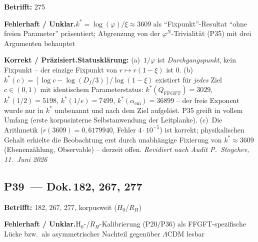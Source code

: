 \noindent\textbf{Betrifft:} 275


\smallskip\noindent\textbf{Fehlerhaft / Unklar.}\quad $k^* = \log(\varphi)/\xi \approx 3609$ als \enquote{Fixpunkt}-Resultat
  \enquote{ohne freien Parameter} präsentiert; Abgrenzung von der
  $\varphi^N$-Trivialität (P35) mit drei Argumenten behauptet


\smallskip\noindent\textbf{Korrekt / Präzisiert.}\quad \textbf{Statusklärung:} (a)~$1/\varphi$ ist \emph{Durchgangspunkt},
  kein Fixpunkt -- der einzige Fixpunkt von $r\mapsto r(1-\xi)$ ist $0$.
  (b)~$k^*(c) = [\log c - \log(D_f/3)]/\log(1-\xi)$ existiert für
  \emph{jedes} Ziel $c\in(0,1)$ mit identischem Parameterstatus:
  $k^*(Q_\mathrm{FFGFT})=3029$, $k^*(1/2)=5198$, $k^*(1/e)=7499$,
  $k^*(\alpha_\mathrm{em})=36899$ -- der freie Exponent wurde nur in
  $k^*$ umbenannt und nach dem Ziel aufgelöst. P35 greift in vollem
  Umfang (erste korpusinterne Selbstanwendung der Leitplanke).
  (c)~Die Arithmetik ($r(3609)=0{,}6179940$, Fehler $4{\cdot}10^{-5}$)
  ist korrekt; physikalischen Gehalt erhielte die Beobachtung erst
  durch unabhängige Fixierung von $k^*\approx3609$ (Ebenenzählung,
  Observable) -- derzeit offen.
  \emph{Revidiert nach Audit P.~Stoychev, 11.~Juni 2026}


\medskip


\subsection*{P39~--- Dok.\,182, 267, 277}

\noindent\textbf{Betrifft:} 182, 267, 277, korpusweit ($H_0$/$R_H$)


\smallskip\noindent\textbf{Fehlerhaft / Unklar.}\quad H$_0$-/$R_H$-Kalibrierung (P20/P36) als FFGFT-spezifische Lücke bzw.\ als asymmetrischer Nachteil gegenüber $\Lambda$CDM lesbar


